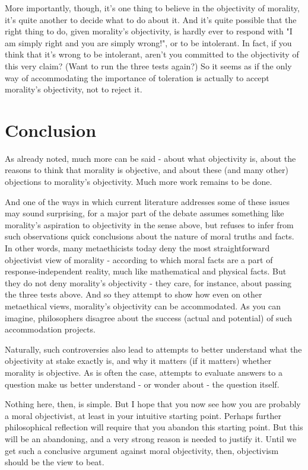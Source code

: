 More importantly, though, it's one thing to believe in the objectivity of morality, it's 
quite another to decide what to do about it. And it's quite possible that the right thing 
to do, given morality's objectivity, is hardly ever to respond with "I am simply right and 
you are simply wrong!", or to be intolerant. In fact, if you think that it's wrong to be 
intolerant, aren't you committed to the objectivity of this very claim? (Want to run the 
three tests again?) So it seems as if the only way of accommodating the importance of 
toleration is actually to accept morality's objectivity, not to reject it. 

\section{Conclusion}
As already noted, much more can be said - about what objectivity is, about the reasons 
to think that morality is objective, and about these (and many other) objections to 
morality's objectivity. Much more work remains to be done.  

And one of the ways in which current literature addresses some of these issues 
may sound surprising, for a major part of the debate assumes something like morality's 
aspiration to objectivity in the sense above, but refuses to infer from such observations 
quick conclusions about the nature of moral truths and facts. In other words, many
metaethicists today deny the most straightforward objectivist view of morality - 
according to which moral facts are a part of response-independent reality, much like 
mathematical and physical facts. But they do not deny morality's objectivity - they care, 
for instance, about passing the three tests above. And so they attempt to show how 
even on other metaethical views, morality's objectivity can be accommodated. As you 
can imagine, philosophers disagree about the success (actual and potential) of such 
accommodation projects.  

Naturally, such controversies also lead to attempts to better understand what 
the objectivity at stake exactly is, and why it matters (if it matters) whether morality is 
objective. As is often the case, attempts to evaluate answers to a question make us 
better understand - or wonder about - the question itself.  

Nothing here, then, is simple. But I hope that you now see how you are probably 
a moral objectivist, at least in your intuitive starting point. Perhaps further philosophical 
reflection will require that you abandon this starting point. But this will be an 
abandoning, and a very strong reason is needed to justify it. Until we get such a 
conclusive argument against moral objectivity, then, objectivism should be the view to 
beat.